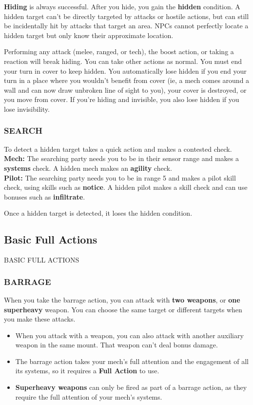 \textbf{Hiding} is always successful. After you hide, you gain the \textbf{hidden} condition. A hidden target can’t be directly targeted by attacks or hostile actions, but can still be incidentally hit by attacks that target an area. NPCs cannot perfectly locate a hidden target but only know their approximate location. 

Performing any attack (melee, ranged, or tech), the boost action, or taking a reaction will break hiding. You can take other actions as normal. You must end your turn in cover to keep hidden. You automatically lose hidden if you end your turn in a place where you wouldn’t benefit from cover (ie, a mech comes around a wall and can now draw unbroken line of sight to you), your cover is destroyed, or you move from cover. If you’re hiding and invisible, you also lose hidden if you lose invisibility.


\subsubsection{SEARCH}

To detect a hidden target takes a quick action and makes a contested check.\\
\qquad\textbf{Mech:} The searching party needs you to be in their sensor range and makes a \textbf{systems} check. A hidden mech makes an \textbf{agility} check.\\
\qquad\textbf{Pilot:} The searching party needs you to be in range 5 and makes a pilot skill check, using skills such as \textbf{notice}. A hidden pilot makes a skill check and can use bonuses such as \textbf{infiltrate}.

Once a hidden target is detected, it loses the hidden condition.


\subsection{Basic Full Actions}BASIC FULL ACTIONS
\subsubsection{BARRAGE}

When you take the barrage action, you can attack with \textbf{two weapons}, or \textbf{one superheavy} weapon. You can choose the same target or different targets when you make these attacks.
\begin{itemize}
    \item When you attack with a weapon, you can also attack with another auxiliary weapon in the same mount. That weapon can’t deal bonus damage.
    \item The barrage action takes your mech’s full attention and the engagement of all its systems, so it requires a \textbf{Full Action} to use. 
    \item \textbf{Superheavy weapons} can only be fired as part of a barrage action, as they require the full attention of your mech’s systems.
\end{itemize}


